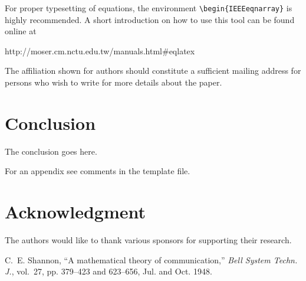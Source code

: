 \documentclass[conference,a4paper]{IEEEtran}
\begin{document}
For proper typesetting of equations, the environment
\verb+\begin{IEEEeqnarray}+ is highly recommended. A short
introduction on how to use this tool can be found online at
\begin{center}
  http://moser.cm.nctu.edu.tw/manuals.html\#eqlatex
\end{center}

The affiliation shown for authors should constitute a sufficient
mailing address for persons who wish to write for more details about
the paper.


\section{Conclusion}

The conclusion goes here. 

For an appendix see comments in the template file.




\section*{Acknowledgment}

The authors would like to thank various sponsors for supporting 
their research. 


%
%
\begin{thebibliography}{1}
  C.~E. Shannon, ``A mathematical theory of communication,''
  \emph{Bell System Techn. J.}, vol.~27, pp. 379--423 and 623--656,
  Jul. and Oct. 1948. 
\end{thebibliography}
\end{document}
